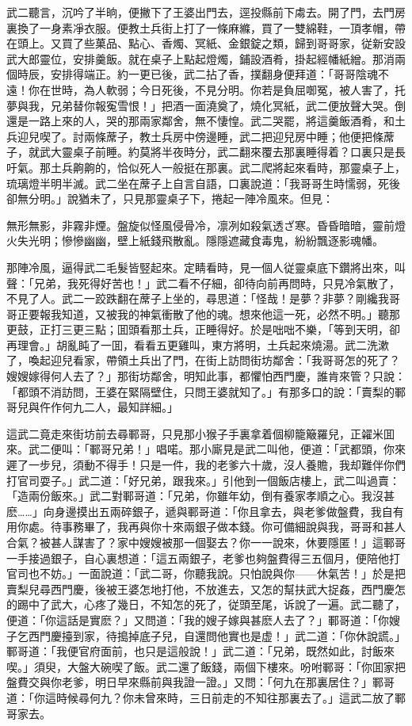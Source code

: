 武二聽言，沉吟了半晌，便撇下了王婆出門去，逕投縣前下䖏去。開了門，去門房裏換了一身素凈衣服。便教土兵街上打了一條麻縧，買了一雙綿鞋，一頂孝帽，帶在頭上。又買了些菓品、點心、香燭、冥紙、金銀錠之類，歸到哥哥家，従新安設武大郎靈位，安排羹飯。就在桌子上點起燈燭，鋪設酒肴，掛起經幡紙繒。那消兩個時辰，安排得端正。約一更已後，武二拈了香，撲翻身便拜道：「哥哥陰魂不遠！你在世時，為人軟弱；今日死後，不見分明。你若是負屈啣冤，被人害了，托夢與我，兄弟替你報寃雪恨！」把酒一面澆奠了，燒化冥紙，武二便放聲大哭。倒還是一路上來的人，哭的那兩家鄰舍，無不悽惶。武二哭罷，將這羹飯酒肴，和土兵迎兒喫了。討兩條蓆子，教土兵房中傍邊睡，武二把迎兒房中睡；他便把條蓆子，就武大靈桌子前睡。約莫將半夜時分，武二翻來覆去那裏睡得着？口裏只是長吁氣。那土兵齁齁的，恰似死人一般挺在那裏。武二爬將起來看時，那靈桌子上，琉璃燈半明半滅。武二坐在蓆子上自言自語，口裏說道：「我哥哥生時懦弱，死後卻無分明。」說猶未了，只見那靈桌子下，捲起一陣冷風來。但見：

無形無影，非霧非煙。盤旋似怪風侵骨冷，凛冽如殺氣透ざ寒。昏昏暗暗，靈前燈火失光明；慘慘幽幽，壁上紙錢飛散亂。隱隱遮藏食毒鬼，紛紛飄逐影魂幡。

那陣冷風，逼得武二毛髮皆竪起來。定睛看時，見一個人従靈桌底下鑽將出來，叫聲：「兄弟，我死得好苦也！」武二看不仔細，卻待向前再問時，只見冷氣散了，不見了人。武二一跤跌翻在蓆子上坐的，尋思道：「怪哉！是夢？非夢？剛纔我哥哥正要報我知道，又被我的神氣衝散了他的魂。想來他這一死，必然不明。」聽那更鼓，正打三更三點；囬頭看那土兵，正睡得好。於是咄咄不樂，「等到天明，卻再理會。」胡亂盹了一囬，看看五更雞叫，東方將明，土兵起來燒湯。武二洗漱了，喚起迎兒看家，帶領土兵出了門，在街上訪問街坊鄰舍：「我哥哥怎的死了？嫂嫂嫁得何人去了？」那街坊鄰舍，明知此事，都懼怕西門慶，誰肯來管？只說：「都頭不消訪問，王婆在緊隔壁住，只問王婆就知了。」有那多口的說：「賣梨的鄆哥兒與仵作何九二人，最知詳細。」

這武二竟走來街坊前去尋鄆哥，只見那小猴子手裏拿着個柳籠簸羅兒，正糴米囬來。武二便叫：「鄆哥兄弟！」唱喏。那小廝見是武二叫他，便道：「武都頭，你來遲了一步兒，須動不得手！只是一件，我的老爹六十歲，沒人養贍，我却難伴你們打官司耍子。」武二道：「好兄弟，跟我來。」引他到一個飯店樓上，武二叫過賣：「造兩份飯來。」武二對鄆哥道：「兄弟，你雖年幼，倒有養家孝順之心。我沒甚麽……」向身邊摸出五兩碎銀子，遞與鄆哥道：「你且拿去，與老爹做盤費，我自有用你處。待事務畢了，我再與你十來兩銀子做本錢。你可備細說與我，哥哥和甚人合氣？被甚人謀害了？家中嫂嫂被那一個娶去？你一一說來，休要隱匿！」這鄆哥一手接過銀子，自心裏想道：「這五兩銀子，老爹也夠盤費得三五個月，便陪他打官司也不妨。」一面說道：「武二哥，你聽我說。只怕說與你——休氣苦！」於是把賣梨兒尋西門慶，後被王婆怎地打他，不放進去，又怎的幫扶武大捉姦，西門慶怎的踢中了武大，心疼了幾日，不知怎的死了，従頭至尾，诉說了一遍。武二聽了，便道：「你這話是實麽？」又問道：「我的嫂子嫁與甚麽人去了？」鄆哥道：「你嫂子乞西門慶擡到家，待搗掉底子兒，自還問他實也是虚！」武二道：「你休說謊。」鄆哥道：「我便官府面前，也只是這般說！」武二道：「兄弟，既然如此，討飯來喫。」須臾，大盤大碗喫了飯。武二還了飯錢，兩個下樓來。吩咐鄆哥：「你囬家把盤費交與你老爹，明日早來縣前與我證一證。」又問：「何九在那裏居住？」鄆哥道：「你這時候尋何九？你未曾來時，三日前走的不知往那裏去了。」這武二放了鄆哥家去。

